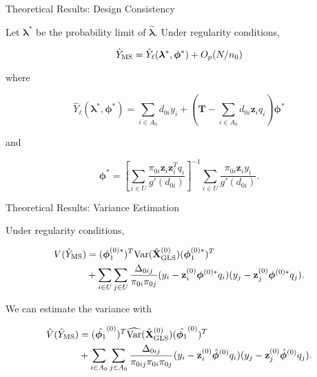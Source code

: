 \documentclass{beamer} %
\newcommand{\Var}{{\text{Var}}}
\renewcommand{\bf}[1]{\mathbf{#1}}
\begin{document}
\begin{frame}{Theoretical Results: Design Consistency}

\begin{theorem}
  Let $\bm \lambda^*$ be the probability limit of $\hat{\bm \lambda}$.
  Under regularity conditions,

  $$\hat Y_{\rm{MS}} = \hat Y_{\ell}(\bm \lambda^*, \bm \phi^*) + O_p(N / n_0)$$

  where

  \begin{equation}\label{eq:linms1}
  \hat Y_\ell(\bm \lambda^*, \bm \phi^*) = \sum_{i \in A_0} d_{0i} y_i 
  + \left(\hat{\bf T} - \sum_{i \in A_0} d_{0i} \bf z_i q_i \right)\bm \phi^*
  \end{equation}

  and 

  $$\bm \phi^* = \left[\sum_{i \in U} \frac{\pi_{0i} \bf z_i \bf z_i^T
  q_i}{g'(d_{0i})}\right]^{-1} \sum_{i \in U} \frac{\pi_{0i} \bf z_i
  y_i}{g'(d_{0i})}.$$
\end{theorem}

\end{frame}

\begin{frame}{Theoretical Results: Variance Estimation}


\begin{theorem}
  Under regularity conditions,

  $$
  \begin{aligned}
    V(\hat Y_{\rm{MS}}) 
    &= 
    (\bm \phi_1^{(0)*})^T\Var(\hat{\bf X}_{\rm{GLS}}^{(0)})
      (\bm \phi_1^{(0)*})^T \\
    &+ 
      \sum_{i \in U} \sum_{j \in U} \frac{\Delta_{0ij}}{\pi_{0i}\pi_{0j}}
      (y_i - \bf z_i^{(0)}\bm \phi^{(0)*}q_i)
      (y_j - \bf z_j^{(0)}\bm \phi^{(0)*}q_j). 
  \end{aligned}
  $$

  We can estimate the variance with

  $$
  \begin{aligned}
    \hat V(\hat Y_{\rm{MS}}) 
    &=
    (\hat{\bm \phi_1}^{(0)})^T\widehat{\Var}(\hat{\bf X}_{\rm{GLS}}^{(0)})
        (\hat{\bm \phi_1}^{(0)})^T \\
    &+
      \sum_{i \in A_0} \sum_{j \in A_0} \frac{\Delta_{0ij}}{\pi_{0ij}\pi_{0i}\pi_{0j}}
      (y_i - \bf z_i^{(0)}\hat{\bm \phi}^{(0)}q_i)
      (y_j - \bf z_j^{(0)}\hat{\bm \phi}^{(0)}q_j).
  \end{aligned}
  $$

\end{theorem}

\end{frame}
\end{document}
